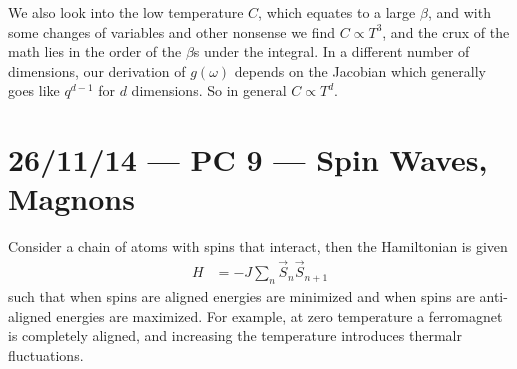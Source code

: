 \documentclass[10pt]{report}
\begin{document}
We also look into the low temperature $C$, which equates to a large $\beta$, and with some changes of variables and other nonsense we find $C \propto T^3$, and the crux of the math lies in the order of the $\beta$s under the integral. In a different number of dimensions, our derivation of $g(\omega)$ depends on the Jacobian which generally goes like $q^{d-1}$ for $d$ dimensions. So in general $C \propto T^d$.
\chapter{26/11/14 --- PC 9 --- Spin Waves, Magnons}

Consider a chain of atoms with spins that interact, then the Hamiltonian is given
\begin{align}
    H &= -J \sum\limits_{n}^{}\vec{S}_n\vec{S}_{n+1}
\end{align}
such that when spins are aligned energies are minimized and when spins are anti-aligned energies are maximized. For example, at zero temperature a ferromagnet is completely aligned, and increasing the temperature introduces thermalr fluctuations.
\end{document}

